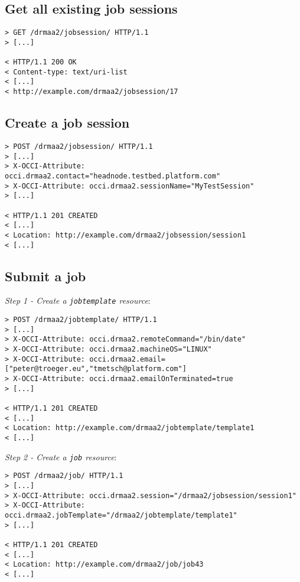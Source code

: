 \documentclass[10pt]{article}
\newcommand{\h}[1]{\lstinline|#1|}
\begin{document}
\subsection{Get all existing job sessions}

\begin{verbatim}
> GET /drmaa2/jobsession/ HTTP/1.1
> [...]

< HTTP/1.1 200 OK 
< Content-type: text/uri-list
< [...]
< http://example.com/drmaa2/jobsession/17
\end{verbatim}


\subsection{Create a job session}

\begin{verbatim}
> POST /drmaa2/jobsession/ HTTP/1.1
> [...]
> X-OCCI-Attribute: occi.drmaa2.contact="headnode.testbed.platform.com"
> X-OCCI-Attribute: occi.drmaa2.sessionName="MyTestSession"
> [...]

< HTTP/1.1 201 CREATED 
< [...] 
< Location: http://example.com/drmaa2/jobsession/session1
< [...]
\end{verbatim}

\subsection{Submit a job}

\emph{Step 1 - Create a \h{jobtemplate} resource}:

\begin{verbatim}
> POST /drmaa2/jobtemplate/ HTTP/1.1
> [...]
> X-OCCI-Attribute: occi.drmaa2.remoteCommand="/bin/date"
> X-OCCI-Attribute: occi.drmaa2.machineOS="LINUX"
> X-OCCI-Attribute: occi.drmaa2.email=["peter@troeger.eu","tmetsch@platform.com"]
> X-OCCI-Attribute: occi.drmaa2.emailOnTerminated=true
> [...]

< HTTP/1.1 201 CREATED 
< [...] 
< Location: http://example.com/drmaa2/jobtemplate/template1
< [...]
\end{verbatim}

\emph{Step 2 - Create a \h{job} resource}:

\begin{verbatim}
> POST /drmaa2/job/ HTTP/1.1
> [...]
> X-OCCI-Attribute: occi.drmaa2.session="/drmaa2/jobsession/session1"
> X-OCCI-Attribute: occi.drmaa2.jobTemplate="/drmaa2/jobtemplate/template1"
> [...]

< HTTP/1.1 201 CREATED 
< [...] 
< Location: http://example.com/drmaa2/job/job43
< [...]
\end{verbatim}
\end{document}
